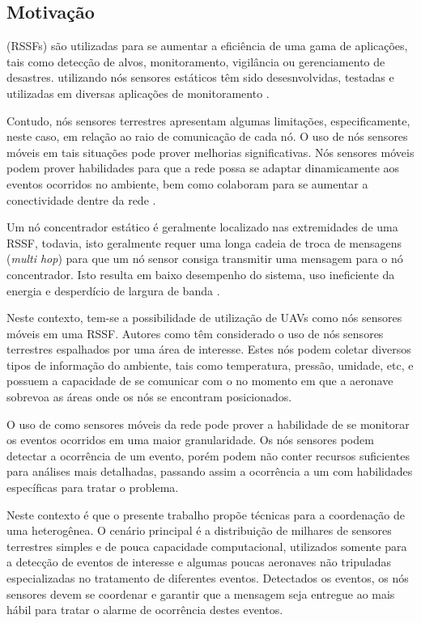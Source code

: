 
\subsection{Motivação}
\wsn (RSSFs) são utilizadas para se aumentar a eficiência de uma gama de
aplicações, tais como detecção de alvos, monitoramento, vigilância ou
gerenciamento de desastres. \rssfs utilizando nós sensores estáticos têm sido
desesnvolvidas, testadas e utilizadas em diversas aplicações de monitoramento
\cite{Mainwaring2002}.

Contudo, nós sensores terrestres apresentam algumas limitações, especificamente,
neste caso, em relação ao raio de comunicação de cada nó. O uso de nós sensores
móveis em tais situações pode prover melhorias significativas. Nós sensores
móveis podem prover habilidades para que a rede possa se adaptar dinamicamente
aos eventos ocorridos no ambiente, bem como colaboram para se aumentar a
conectividade dentre da rede  \cite{Aware}.

Um nó concentrador estático é geralmente localizado nas extremidades de uma
RSSF, todavia, isto geralmente requer uma longa cadeia de troca de mensagens
(\emph{multi hop}) para que um nó sensor consiga transmitir uma mensagem para o
nó concentrador. Isto resulta em baixo desempenho do sistema, uso ineficiente da
energia e desperdício de largura de banda \cite{Chang2007}.

Neste contexto, tem-se a possibilidade de utilização de UAVs como nós sensores
móveis em uma RSSF. Autores como \cite{Lucchi2007} têm considerado o uso de nós
sensores terrestres espalhados por uma área de interesse. Estes nós podem
coletar diversos tipos de informação do ambiente, tais como temperatura,
pressão, umidade, etc, e possuem a capacidade de se comunicar com o \vant no
momento em que a aeronave sobrevoa as áreas onde os nós se encontram
posicionados.

O uso de \vants como sensores móveis da rede pode prover a habilidade de se
monitorar os eventos ocorridos em uma maior granularidade. Os nós sensores podem
detectar a ocorrência de um evento, porém podem não conter recursos suficientes
para análises mais detalhadas, passando assim a ocorrência a um \vant com
habilidades específicas para tratar o problema.

Neste contexto é que o presente trabalho propõe técnicas para a coordenação de
uma \rssf heterogênea. O cenário principal é a distribuição de milhares de
sensores terrestres simples e de pouca capacidade computacional, utilizados
somente para a detecção de eventos de interesse e algumas poucas aeronaves não
tripuladas especializadas no tratamento de diferentes eventos. Detectados os
eventos, os nós sensores devem se coordenar e garantir que a mensagem seja
entregue ao \vant mais hábil para tratar o alarme de ocorrência destes eventos.


